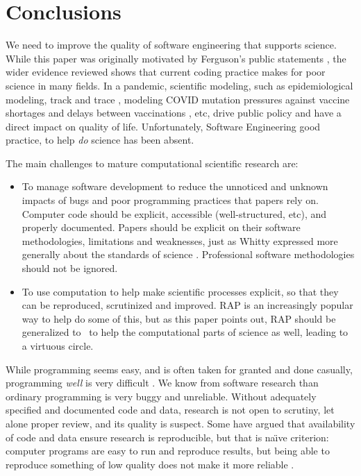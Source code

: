\documentclass{comjnl}
\begin{document}
\section{Conclusions}
We need to improve the quality of software engineering that supports science. While this paper was originally motivated by Ferguson's public statements , the wider evidence reviewed shows that current coding practice makes for poor science in many fields. In a pandemic, scientific modeling, such as epidemiological modeling, track and trace \cite{excel-fiasco}, modeling COVID mutation pressures against vaccine shortages and delays between vaccinations \cite{science-delays}, etc, drive public policy and have a direct impact on quality of life. Unfortunately, Software Engineering good practice, to help \emph{do\/} science has been absent.

The main challenges to mature computational scientific research are:

\begin{itemize}\raggedright
\item 
To manage software development to reduce the unnoticed and unknown impacts of bugs and poor programming practices that papers rely on. Computer code should be explicit, accessible (well-structured, etc), and properly documented. Papers should be explicit on their software methodologies, limitations and weaknesses, just as Whitty expressed more generally about the standards of science \cite{whitty}. Professional software methodologies should not be ignored.

\item 
To use computation to help make scientific processes explicit, so that they can be reproduced, scrutinized and improved. RAP is an increasingly popular way to help do some of this, but as this paper points out, RAP should be generalized to \RAPstar\ to help the computational parts of science as well, leading to a virtuous circle.
\end{itemize}

While programming seems easy, and is often taken for granted and done casually, programming \emph{well\/} is very difficult \cite{fixit}. We know from software research than ordinary programming is very buggy and unreliable. Without adequately specified and documented code and data, research is not open to scrutiny, let alone proper review, and its quality is suspect. Some have argued that availability of code and data ensure research is reproducible, but that is na\"\i ve criterion: computer programs are easy to run and reproduce results, but being able to reproduce something of low quality does not make it more reliable \cite{reproducibility,relit,popper}. 
\end{document}
